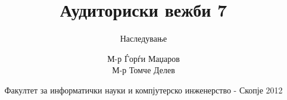 

\author[АВ7]{М-р Ѓорѓи Маџаров\\М-р Томче Делев}
\title[Објектно ориентирано програмирање]{Аудиториски вежби 7}
\subtitle{Наследување}
\date{Факултет за информатички науки и компјутерско инженерство - Скопје 2012}





\frame[t,plain]{\titlepage}






